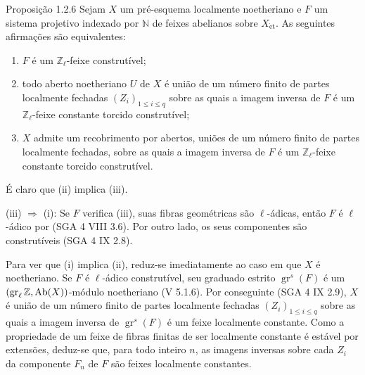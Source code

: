 \begin{statement}{Proposição 1.2.6}
Sejam \(X\) um pré-esquema localmente noetheriano e \(F\) um sistema projetivo indexado por \(\mathbb N\) de feixes abelianos sobre \(X_{\mathrm{\acute et}}\). As seguintes afirmações são equivalentes:
\begin{enumerate}[label=(\roman*)]
\item \(F\) é um \(\mathbb Z_\ell\)-feixe construtível;
\item todo aberto noetheriano \(U\) de \(X\) é união de um número finito de partes localmente fechadas \((Z_i)_{1\le i\le q}\) sobre as quais a imagem inversa de \(F\) é um \(\mathbb Z_\ell\)-feixe constante torcido construtível;
\item \(X\) admite um recobrimento por abertos, uniões de um número finito de partes localmente fechadas, sobre as quais a imagem inversa de \(F\) é um \(\mathbb Z_\ell\)-feixe constante torcido construtível.
\end{enumerate}
\end{statement}

\begin{prooftext}[Demonstração]
É claro que (ii) implica (iii).

(iii) \(\Longrightarrow\) (i): Se \(F\) verifica (iii), suas fibras geométricas são \(\ell\)-ádicas, então \(F\) é \(\ell\)-ádico por (SGA 4 VIII 3.6). Por outro lado, os seus componentes são construtíveis (SGA 4 IX 2.8).

Para ver que (i) implica (ii), reduz-se imediatamente ao caso em que \(X\) é noetheriano. Se \(F\) é \(\ell\)-ádico construtível, seu graduado estrito \(\operatorname{gr}^s(F)\) é um \((\operatorname{gr}_\ell\mathbb Z,\operatorname{Ab}(X))\)-módulo noetheriano (V 5.1.6). Por conseguinte (SGA 4 IX 2.9), \(X\) é união de um número finito de partes localmente fechadas \((Z_i)_{1\le i\le q}\) sobre as quais a imagem inversa de \(\operatorname{gr}^s(F)\) é um feixe localmente constante. Como a propriedade de um feixe de fibras finitas de ser localmente constante é estável por extensões, deduz-se que, para todo inteiro \(n\), as imagens inversas sobre cada \(Z_i\) da componente \(F_n\) de \(F\) são feixes localmente constantes.
\end{prooftext}
